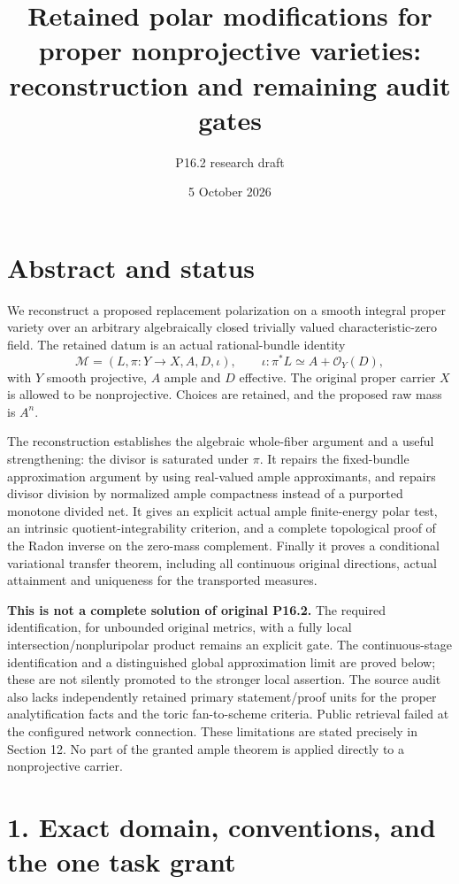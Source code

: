 \documentclass[
  10pt,
]{article}
\title{Retained polar modifications for proper nonprojective varieties:
reconstruction and remaining audit gates}
\author{P16.2 research draft}
\date{5 October 2026}
\begin{document}
\maketitle

{
\setcounter{tocdepth}{3}
\tableofcontents
}
\section{Abstract and status}\label{abstract-and-status}

We reconstruct a proposed replacement polarization on a smooth integral
proper variety over an arbitrary algebraically closed trivially valued
characteristic-zero field. The retained datum is an actual
rational-bundle identity \[
 \mathcal M=(L,\pi:Y\longrightarrow X,A,D,\iota),\qquad
 \iota:\pi^*L\simeq A+\mathcal O_Y(D),
\] with \(Y\) smooth projective, \(A\) ample and \(D\) effective. The
original proper carrier \(X\) is allowed to be nonprojective. Choices
are retained, and the proposed raw mass is \(A^n\).

The reconstruction establishes the algebraic whole-fiber argument and a
useful strengthening: the divisor is saturated under \(\pi\). It repairs
the fixed-bundle approximation argument by using real-valued ample
approximants, and repairs divisor division by normalized ample
compactness instead of a purported monotone divided net. It gives an
explicit actual ample finite-energy polar test, an intrinsic
quotient-integrability criterion, and a complete topological proof of
the Radon inverse on the zero-mass complement. Finally it proves a
conditional variational transfer theorem, including all continuous
original directions, actual attainment and uniqueness for the
transported measures.

\textbf{This is not a complete solution of original P16.2.} The required
identification, for unbounded original metrics, with a fully local
intersection/nonpluripolar product remains an explicit gate. The
continuous-stage identification and a distinguished global approximation
limit are proved below; these are not silently promoted to the stronger
local assertion. The source audit also lacks independently retained
primary statement/proof units for the proper analytification facts and
the toric fan-to-scheme criteria. Public retrieval failed at the
configured network connection. These limitations are stated precisely in
Section 12. No part of the granted ample theorem is applied directly to
a nonprojective carrier.

\section{1. Exact domain, conventions, and the one task
grant}\label{exact-domain-conventions-and-the-one-task-grant}
\end{document}
